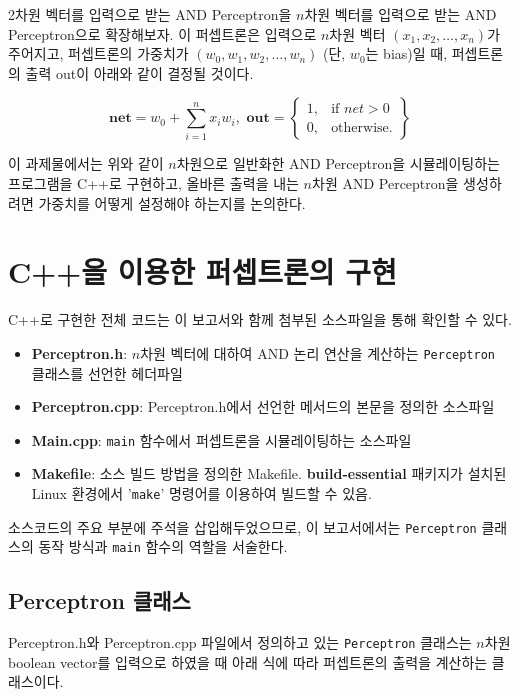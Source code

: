 \documentclass[letterpaper,10pt]{article}
\begin{document}
2차원 벡터를 입력으로 받는 AND Perceptron을 $n$차원 벡터를 입력으로 받는 AND Perceptron으로 확장해보자. 이 퍼셉트론은 입력으로 $n$차원 벡터 $(x_1, x_2, \dots, x_n)$가 주어지고, 퍼셉트론의 가중치가 $(w_0, w_1, w_2, \dots, w_n)$ (단, $w_0$는 bias)일 때, 퍼셉트론의 출력 out이 아래와 같이 결정될 것이다.

\[
\textbf{net}=w_0 + \sum_{i=1}^{n} x_i w_i, \textbf{ out}=\left.
\begin{cases}
    1, & \text{if }net > 0\\
    0, & \text{otherwise.}
\end{cases}
\right\}
\]

이 과제물에서는 위와 같이 $n$차원으로 일반화한 AND Perceptron을 시뮬레이팅하는 프로그램을 C++로 구현하고, 올바른 출력을 내는 $n$차원 AND Perceptron을 생성하려면 가중치를 어떻게 설정해야 하는지를 논의한다.

\section{C++을 이용한 퍼셉트론의 구현}

C++로 구현한 전체 코드는 이 보고서와 함께 첨부된 소스파일을 통해 확인할 수 있다.

\begin{itemize}
    \item \textbf{Perceptron.h}: $n$차원 벡터에 대하여 AND 논리 연산을 계산하는 \texttt{Perceptron} 클래스를 선언한 헤더파일
    \item \textbf{Perceptron.cpp}: Perceptron.h에서 선언한 메서드의 본문을 정의한 소스파일
    \item \textbf{Main.cpp}: \texttt{main} 함수에서 퍼셉트론을 시뮬레이팅하는 소스파일
    \item \textbf{Makefile}: 소스 빌드 방법을 정의한 Makefile. \textbf{build-essential} 패키지가 설치된 Linux 환경에서 '\texttt{make}' 명령어를 이용하여 빌드할 수 있음.
\end{itemize}

소스코드의 주요 부분에 주석을 삽입해두었으므로, 이 보고서에서는 \texttt{Perceptron} 클래스의 동작 방식과 \texttt{main} 함수의 역할을 서술한다.

\subsection{Perceptron 클래스}

Perceptron.h와 Perceptron.cpp 파일에서 정의하고 있는 \texttt{Perceptron} 클래스는 $n$차원 boolean vector를 입력으로 하였을 때 아래 식에 따라 퍼셉트론의 출력을 계산하는 클래스이다.
\end{document}
